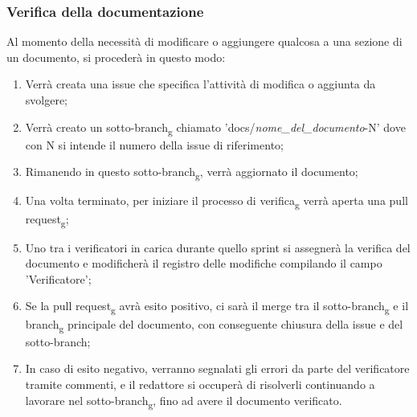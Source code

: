 \subsubsection{Verifica della documentazione} Al momento della necessità di modificare o aggiungere qualcosa a una sezione di
un documento, si procederà in questo modo:
\begin{enumerate}
      \item Verrà creata una issue che specifica l'attività di modifica o aggiunta da
            svolgere;
      \item Verrà creato un sotto-branch\textsubscript{g} chiamato
            'docs/\textit{nome\_del\_documento}-N' dove con N si intende il numero della
            issue di riferimento;
      \item Rimanendo in questo sotto-branch\textsubscript{g}, verrà aggiornato il
            documento;
      \item Una volta terminato, per iniziare il processo di verifica\textsubscript{g}
            verrà aperta una pull request\textsubscript{g};
      \item Uno tra i verificatori in carica durante quello sprint si assegnerà la verifica
            del documento e modificherà il registro delle modifiche compilando il campo
            'Verificatore';
      \item Se la pull request\textsubscript{g} avrà esito positivo, ci sarà il merge tra
            il sotto-branch\textsubscript{g} e il branch\textsubscript{g} principale del
            documento, con conseguente chiusura della issue e del sotto-branch;
      \item In caso di esito negativo, verranno segnalati gli errori da parte del
            verificatore tramite commenti, e il redattore si occuperà di risolverli
            continuando a lavorare nel sotto-branch\textsubscript{g}, fino ad avere il
            documento verificato.
\end{enumerate}

